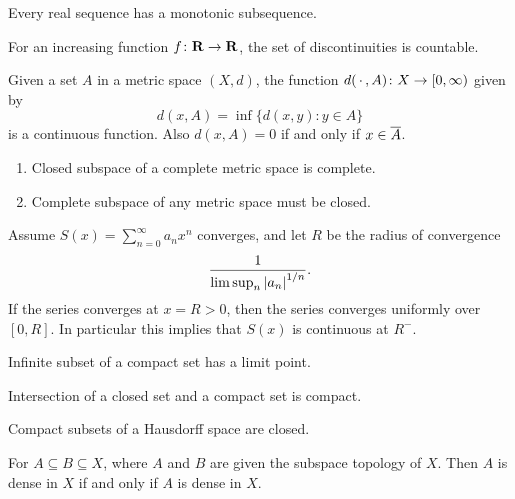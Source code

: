 \begin{fact}
    Every real sequence has a monotonic subsequence.
\end{fact}

\begin{prop} \label{prop:discont-countable}
    For an increasing function $f\colon \mathbf{R}\to \mathbf{R}$, the set of discontinuities is countable.
\end{prop}

\begin{prop}\label{prop:dist-set-cont}
    Given a set $A$ in a metric space $(X,d)$, the function $d(\,\cdot\,,A)\colon X \to [0,\infty)$ given by \[
        d(x,A) = \inf\{d(x,y) : y\in A\}
    \] is a continuous function. Also $d(x,A) = 0$ if and only if $x \in \overline{A}$.
\end{prop}

\begin{prop} \leavevmode
\begin{enumerate}
    \item Closed subspace of a complete metric space is complete.
    \item Complete subspace of any metric space must be closed.
\end{enumerate}
\end{prop}

\begin{namedthm}
    Assume $S(x) = \sum_{n=0}^\infty a_n x^n$ converges, and let $R$ be the radius of convergence \[ \frac{1}{\limsup_n {\lvert a_n \rvert}^{1/n}}.\] If the series converges at $x = R > 0$, then the series converges uniformly over $[0,R]$. In particular this implies that $S(x)$ is continuous at $R^-$.
\end{namedthm}

\begin{prop}
    Infinite subset of a compact set has a limit point.
\end{prop}

\begin{prop}\label{prop:closed-compact-intersect}
    Intersection of a closed set and a compact set is compact.
\end{prop}

\begin{prop}\label{prop:compact-subset-Hausdorff}
    Compact subsets of a Hausdorff space are closed.
\end{prop}

\begin{prop}
    For $A \subseteq B \subseteq X$, where $A$ and $B$ are given the subspace topology of $X$. Then $A$ is dense in $X$ if and only if $A$ is dense in $X$.
\end{prop}

